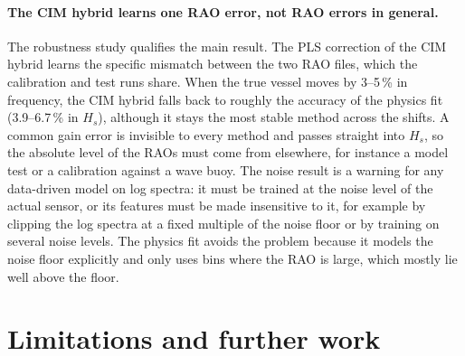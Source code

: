 \documentclass[11pt,a4paper]{article}
\newcommand{\Hs}{H_{s}}
\begin{document}
\paragraph{The CIM hybrid learns one RAO error, not RAO errors in general.}
The robustness study qualifies the main result. The PLS correction of the CIM hybrid learns the
specific mismatch between the two RAO files, which the calibration and test runs share. When the
true vessel moves by 3--5\,\% in frequency, the CIM hybrid falls back to roughly the accuracy of the
physics fit (3.9--6.7\,\% in $\Hs$), although it stays the most stable method across the shifts.
A common gain error is invisible to every method and passes straight into $\Hs$, so the absolute
level of the RAOs must come from elsewhere, for instance a model test or a calibration against a
wave buoy. The noise result is a warning for any data-driven model on log spectra: it must be
trained at the noise level of the actual sensor, or its features must be made insensitive to it,
for example by clipping the log spectra at a fixed multiple of the noise floor or by training on
several noise levels. The physics fit avoids the problem because it models the noise floor
explicitly and only uses bins where the RAO is large, which mostly lie well above the floor.

\section{Limitations and further work}
\label{sec:limitations}
\end{document}
